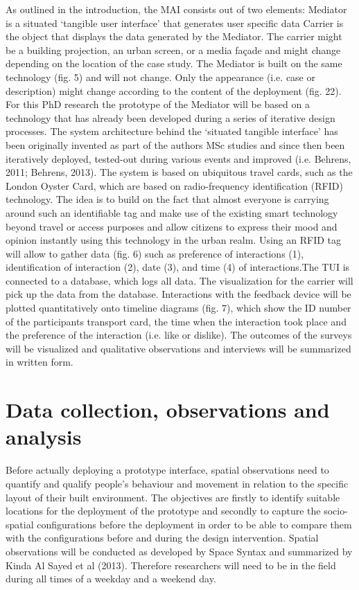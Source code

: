 As outlined in the introduction, the MAI consists out of two elements: 
Mediator is a situated ‘tangible user interface’ that generates user specific data 
Carrier is the object that displays the data generated by the Mediator. 
The carrier might be a building projection, an urban screen, or a media façade and might change depending on the location of the case study. The Mediator is built on the same technology (fig. 5) and will not change. Only the appearance (i.e. case or description) might change according to the content of the deployment (fig. 22).
For this PhD research the prototype of the Mediator will be based on a technology that has already been developed during a series of iterative design processes. The system architecture behind the ‘situated tangible interface’ has been originally invented as part of the authors MSc studies and since then been iteratively deployed, tested-out during various events and improved (i.e. Behrens, 2011; Behrens, 2013). The system is based on ubiquitous travel cards, such as the London Oyster Card, which are based on radio-frequency identification (RFID) technology. The idea is to build on the fact that almost everyone is carrying around such an identifiable tag and make use of the existing smart technology beyond travel or access purposes and allow citizens to express their mood and opinion instantly using this technology in the urban realm. Using an RFID tag will allow to gather data (fig. 6) such as preference of interactions (1), identification of interaction (2), date (3), and time (4) of interactions.The TUI is connected to a database, which logs all data. The visualization for the carrier will pick up the data from the database. Interactions with the feedback device will be plotted quantitatively onto timeline diagrams  (fig. 7), which show the ID number of the participants transport card, the time when the interaction took place and the preference of the interaction (i.e. like or dislike).
The outcomes of the surveys will be visualized and qualitative observations and interviews will be summarized in written form.


\section{Data collection, observations and analysis}

Before actually deploying a prototype interface, spatial observations need to quantify and qualify people’s behaviour and movement in relation to the specific layout of their built environment. The objectives are firstly to identify suitable locations for the deployment of the prototype and secondly to capture the socio-spatial configurations before the deployment in order to be able to compare them with the configurations before and during the design intervention. Spatial observations will be conducted as developed by Space Syntax and summarized by Kinda Al Sayed et al (2013). Therefore researchers will need to be in the field during all times of a weekday and a weekend day.